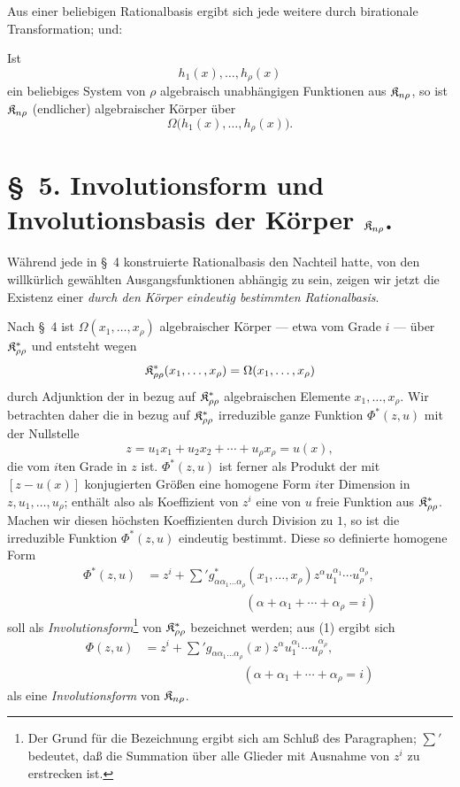 Aus einer beliebigen Rationalbasis ergibt sich jede weitere durch birationale Transformation; und:

Ist
\[
  h_1(x),\ldots,h_\rho(x)
\]
ein beliebiges System von $\rho$ algebraisch unabhängigen Funktionen aus $\mathfrak{K}_{n\rho}$, so ist $\mathfrak{K}_{n\rho}$ (endlicher) algebraischer Körper über
\[
  \Omega\bigl(h_1(x),\ldots,h_\rho(x)\bigr).
\]

\section*{\S\ 5. Involutionsform und Involutionsbasis der Körper $\mathfrak{K}_{n\rho}$.}

Während jede in \S\ 4 konstruierte Rationalbasis den Nachteil hatte, von den willkürlich gewählten Ausgangsfunktionen abhängig zu sein, zeigen wir jetzt die Existenz einer \emph{durch den Körper eindeutig bestimmten Rationalbasis}.

Nach \S\ 4 ist $\Omega(x_1,\ldots,x_\rho)$ algebraischer Körper --- etwa vom Grade $i$ --- über $\mathfrak{K}^*_{\rho\rho}$ und entsteht wegen
\[
  \mathfrak{K}^*_{\rho\rho}(x_1,
  \ldots,x_\rho)=\Omega(x_1,\ldots,x_\rho)
\]
durch Adjunktion der in bezug auf $\mathfrak{K}^*_{\rho\rho}$ algebraischen Elemente $x_1,
\ldots,x_\rho$. Wir betrachten daher die in bezug auf $\mathfrak{K}^*_{\rho\rho}$ irreduzible ganze Funktion $\Phi^*(z,u)$ mit der Nullstelle
\[
  z=u_1x_1+u_2x_2+\cdots+u_\rho x_\rho=u(x),
\]
die vom $i$ten Grade in $z$ ist. $\Phi^*(z,u)$ ist ferner als Produkt der mit $[z-u(x)]$ konjugierten Größen eine homogene Form $i$ter Dimension in $z,u_1,
\ldots,u_\rho$; enthält also als Koeffizient von $z^i$ eine von $u$ freie Funktion aus $\mathfrak{K}^*_{\rho\rho}$. Machen wir diesen höchsten Koeffizienten durch Division zu $1$, so ist die irreduzible Funktion $\Phi^*(z,u)$ eindeutig bestimmt. Diese so definierte homogene Form
\begin{equation}
\begin{aligned}
  \Phi^*(z,u)
  &=z^i+
    \sum{}' g^*_{\alpha\alpha_1\ldots\alpha_\rho}(x_1,
    \ldots,x_\rho)
    z^\alpha u_1^{\alpha_1}\cdots u_\rho^{\alpha_\rho},\\
  &\hspace{8em}(\alpha+\alpha_1+\cdots+\alpha_\rho=i)
\end{aligned}
\tag{1}
\end{equation}
soll als \emph{Involutionsform}\footnote{Der Grund für die Bezeichnung ergibt sich am Schluß des Paragraphen; $\sum'$ bedeutet, daß die Summation über alle Glieder mit Ausnahme von $z^i$ zu erstrecken ist.} von $\mathfrak{K}^*_{\rho\rho}$ bezeichnet werden; aus (1) ergibt sich
\begin{equation}
\begin{aligned}
  \Phi(z,u)
  &=z^i+
    \sum{}' g_{\alpha\alpha_1\ldots\alpha_\rho}(x)
    z^\alpha u_1^{\alpha_1}\cdots u_\rho^{\alpha_\rho},\\
  &\hspace{8em}(\alpha+\alpha_1+\cdots+\alpha_\rho=i)
\end{aligned}
\tag{2}
\end{equation}
als eine \emph{Involutionsform} von $\mathfrak{K}_{n\rho}$.


